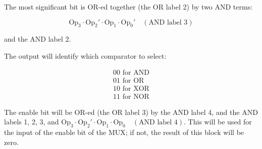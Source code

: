 \documentclass{article}
\begin{document}
The most significant bit is OR-ed together (the OR label 2) by two AND terms:

\[
\text{Op}_3 \cdot \text{Op}_2' \cdot \text{Op}_1 \cdot \text{Op}_0' \quad (\text{AND label 3})
\]

and the AND label 2.

The output will identify which comparator to select:

\[
\begin{array}{l}
00 \text{ for AND} \\
01 \text{ for OR} \\
10 \text{ for XOR} \\
11 \text{ for NOR}
\end{array}
\]

The enable bit will be OR-ed (the OR label 3) by the AND label 4, and the AND labels 1, 2, 3, and \(\text{Op}_3 \cdot \text{Op}_2' \cdot \text{Op}_1 \cdot \text{Op}_0 \quad (\text{AND label 4})\). This will be used for the input of the enable bit of the MUX; if not, the result of this block will be zero.
\end{document}
